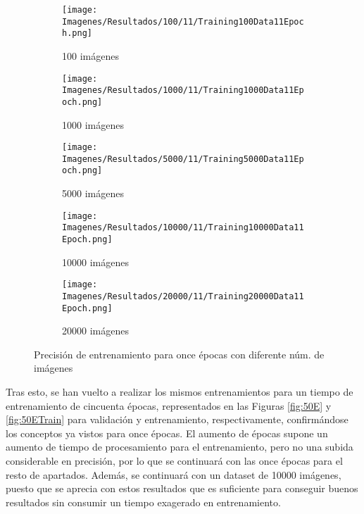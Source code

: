 \documentclass{report}
\begin{document}
\begin{figure}[H]
	 	\centering
	 	\begin{subfigure}[b]{0.45\linewidth}
	 	\centering
	 		\texttt{[image: Imagenes/Resultados/100/11/Training100Data11Epoch.png]}
	 		\caption{ 100 imágenes }
                    \label{fig:11Epo100DTrain}
	 	\end{subfigure}
	 	\begin{subfigure}[b]{0.45\linewidth}
	 	\centering
	 		\texttt{[image: Imagenes/Resultados/1000/11/Training1000Data11Epoch.png]}
	 		\caption{ 1000 imágenes }
                    \label{fig:11Epo1000DTrain}
	 	\end{subfigure}
	 	\centering
	 	\begin{subfigure}[b]{0.45\linewidth}
	 	\centering
	 		\texttt{[image: Imagenes/Resultados/5000/11/Training5000Data11Epoch.png]}
	 		\caption{ 5000 imágenes }
                    \label{fig:11Epo5000DTrain}
	 	\end{subfigure}
	 	\centering
	 	\begin{subfigure}[b]{0.45\linewidth}
	 	\centering
	 		\texttt{[image: Imagenes/Resultados/10000/11/Training10000Data11Epoch.png]}
	 		\caption{ 10000 imágenes }
                    \label{fig:11Epo10000DTrain}
	 	\end{subfigure}
            \begin{subfigure}[b]{0.45\linewidth}
	 	\centering
	 		\texttt{[image: Imagenes/Resultados/20000/11/Training20000Data11Epoch.png]}
	 		\caption{ 20000 imágenes }
                    \label{fig:11Epo2000DTrain}
	 	\end{subfigure}
	 	\caption{ Precisión de entrenamiento para once épocas con diferente núm. de imágenes }
	 	\label{fig:11ETrain}
\end{figure}





Tras esto, se han vuelto a realizar los mismos entrenamientos para un tiempo de entrenamiento de cincuenta épocas, representados en las Figuras \ref{fig:50E} y \ref{fig:50ETrain} para validación y entrenamiento, respectivamente, confirmándose los conceptos ya vistos para once épocas. El aumento de épocas supone un aumento de tiempo de procesamiento para el entrenamiento, pero no una subida considerable en precisión, por lo que se continuará con las once épocas para el resto de apartados. Además, se continuará con un dataset de 10000 imágenes, puesto que se aprecia con estos resultados que es suficiente para conseguir buenos resultados sin consumir un tiempo exagerado en entrenamiento.
\end{document}
